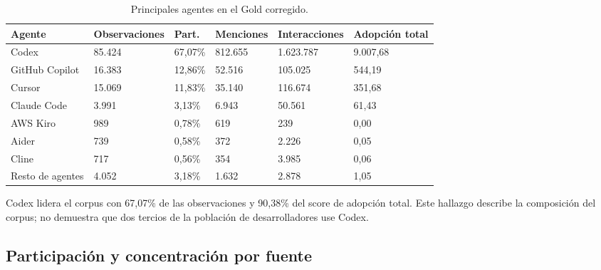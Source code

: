 \documentclass[12pt,a4paper]{article}
\begin{document}
\begin{table}[H]
\centering
\small
{}
\begin{tabularx}{\textwidth}{P{3.0cm} P{2.0cm} P{1.8cm} P{2.2cm} P{2.2cm} Y}
\toprule
{}
\textbf{Agente} & \textbf{Observaciones} & \textbf{Part.} & \textbf{Menciones} & \textbf{Interacciones} & \textbf{Adopción total} \\
\midrule
Codex & 85.424 & 67,07\% & 812.655 & 1.623.787 & 9.007,68 \\
GitHub Copilot & 16.383 & 12,86\% & 52.516 & 105.025 & 544,19 \\
Cursor & 15.069 & 11,83\% & 35.140 & 116.674 & 351,68 \\
Claude Code & 3.991 & 3,13\% & 6.943 & 50.561 & 61,43 \\
AWS Kiro & 989 & 0,78\% & 619 & 239 & 0,00 \\
Aider & 739 & 0,58\% & 372 & 2.226 & 0,05 \\
Cline & 717 & 0,56\% & 354 & 3.985 & 0,06 \\
Resto de agentes & 4.052 & 3,18\% & 1.632 & 2.878 & 1,05 \\
\bottomrule
\end{tabularx}
\caption{Principales agentes en el Gold corregido.}
\label{tab:agentes}
\end{table}

Codex lidera el corpus con 67,07\% de las observaciones y 90,38\% del score de adopción total. Este hallazgo describe la composición del corpus; no demuestra que dos tercios de la población de desarrolladores use Codex.

\subsection{Participación y concentración por fuente}
\end{document}
